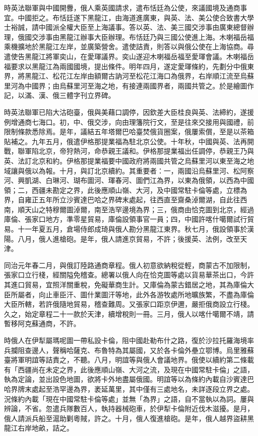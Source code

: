 \begin{pinyinscope}
時英法聯軍與中國開釁，俄人乘英國請求，遣布恬廷為公使，來議國境及通商事宜。中國拒之。布恬廷遂下黑龍江，由海道進廣東，與英、法、美公使合致書大學士裕誠，請中國派全權大臣至上海議事。答以英、法、美三國交涉事由廣東總督辦理，俄國交涉事由黑龍江辦事大臣辦理。布恬廷乃與三國公使進上海。木喇福岳福乘機擴地於黑龍江左岸，並廣築營舍。遣使詰責，則答以與俄公使在上海協商。尋遣使告黑龍江將軍奕山，在愛琿議界。奕山遂迎木喇福岳福至愛琿會議。木喇福岳福要求以黑龍江為兩國國境，提出條件。明年四月，遂定愛琿條約，先劃分中俄東界，將黑龍江、松花江左岸由額爾古訥河至松花江海口為俄界，右岸順江流至烏蘇里河為中國界；由烏蘇里河至海之地，有接連兩國界者，兩國共管之。於是繪圖作記，以滿、漢、俄三體字刊立界碑。

時英法聯軍已陷大沽砲臺，俄與美藉口調停，因欽差大臣桂良與英、法締約，遂援例增通商七海口。初，中、俄交涉，向由理籓院行文，至是往來交接用與國禮，前限制條款悉除焉。是年，議結五年塔爾巴哈臺焚俄貨圈案，俄屢索償，至是以茶箱貼補之。九年五月，俄遣伊格那提業福為駐北京公使。十年秋，中國與英、法再開戰，聯軍陷北京，帝狩熱河，命恭親王議和。伊格那提業福出任調停，恭親王乃與英、法訂北京和約。伊格那提業福要中國政府將兩國共管之烏蘇里河以東至海之地域讓與俄以為報。十月，與訂北京續約。其重要者：一，兩國沿烏蘇里河、松阿察河、興凱湖、白琳河、瑚布圖河、琿春河、圖們江為界，以東為俄領，以西為中國領；二，西疆未勘定之界，此後應順山嶺、大河，及中國常駐卡倫等處，立標為界，自雍正五年所立沙賓達巴哈之界碑末處起，往西直至齋桑淖爾湖，自此往西南，順天山之特穆爾圖淖爾，南至浩罕邊境為界；三，俄商由恰克圖到北京，經過庫倫、張家口地方，準零星貿易，庫倫設領事官一員；四，中國許喀什噶爾試行貿易。十一年夏五月，倉場侍郎成琦與俄人勘分黑龍江東界。秋七月，俄設領事於漢陽。八月，俄人進槍砲。是年，俄人請進京貿易，不許；後援英、法例，改至天津。

同治元年春二月，與俄訂陸路通商章程。俄人初意欲納稅從輕，商蒙古不加限制，張家口立行棧，經關隘免稽查。總署以俄人向在恰克圖等處以貨易華茶出口，今許其進口貿易，宜照洋關重稅，免礙華商生計。又庫倫為蒙古錯居之地，其為庫倫大臣所屬者，向止車臣汗、圖什業圖汗等地，此外各游牧處所地曠族繁，不盡為庫倫大臣所轄，若許俄隨地貿易，稽查難周。又張家口距京伊邇，嚴拒俄商設立行棧。久之，始定章程二十一款於天津，續增稅則一冊。三月，俄人以喀什噶爾不靖，請暫移阿克蘇通商，不許。

時俄人在伊犁屬瑪呢圖一帶私設卡倫，阻中國赴勒布什之路，復於沙拉托羅海境率兵攔阻查邊人，聲稱哈薩克、布魯特為其屬國，又於各卡倫外壘立鄂博。烏里雅蘇臺將軍明誼等詰責之，不聽。八月，明誼等與俄人會議地界。俄使以續約第二條載有「西疆尚在未定之界，此後應順山嶺、大河之流，及現在中國常駐卡倫」之語，執為定論，並出設色地圖，欲將卡外地盡屬俄國。明誼等以為條約內載自沙賓達巴哈界牌末處起至浩罕邊為界，袤延萬里，其中僅有三處地名，未詳逐段立界之處。況條約內載「現在中國常駐卡倫等處」並無「為界」之語，自不當執以為詞。屢與辨論，不省。忽遣兵隊數百人，執持器械砲車，於伊犁卡倫附近伐木滋擾。是月，俄人請派兵船至滬助剿粵賊，許之。十月，俄人復進槍砲。是年，俄人越界盜耕黑龍江右岸地畝，詰之。


\end{pinyinscope}

